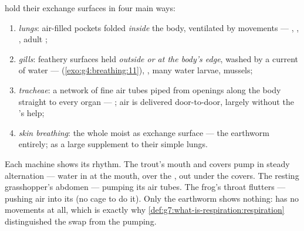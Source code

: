 \begin{definition}\label{def:g7:how-animals-breathe:four}
 hold their exchange surfaces in four main ways:
\begin{enumerate}
  \item \emph{lungs}: air-filled pockets folded
        \emph{inside} the body, ventilated by 
        movements --- , , , adult
        ;
  \item \emph{gills}: feathery surfaces held
        \emph{outside or at the body's edge}, washed by a
        current of water --- 
        (\cref{exo:g4:breathing:11}), , many water
        larvae, mussels;
  \item \emph{tracheae}: a network
        of fine air tubes piped from openings along the
        body straight to every organ --- ; air is
        delivered door-to-door, largely without the 's
        help;
  \item \emph{skin breathing}: the
        whole moist  as exchange surface --- the
        earthworm entirely;  as a large
        supplement to their simple lungs.
\end{enumerate}
\end{definition}

\begin{example}\label{ex:g7:how-animals-breathe:watch}
Each machine shows its rhythm. The trout's mouth and 
covers pump in steady alternation --- water in at the
mouth, over the , out under the covers. The resting
grasshopper's abdomen  --- pumping its air tubes. The
frog's throat flutters --- pushing air into its 
(no  cage to do it). Only the earthworm shows nothing:
 has no movements at all, which is exactly
why \cref{def:g7:what-is-respiration:respiration}
distinguished the swap from the pumping.
\end{example}

